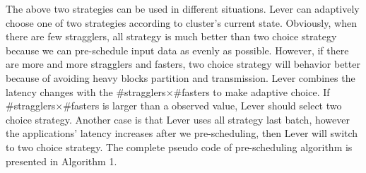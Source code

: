 \documentclass[10pt,conference,compsocconf,letterpaper]{IEEEtran}
\begin{document}
  The above two strategies can be used in different situations. Lever can adaptively choose one of two strategies according to cluster's current state. Obviously, when there are few stragglers, all strategy is much better than two choice strategy because we can pre-schedule input data as evenly as possible. However, if there are more and more stragglers and fasters, two choice strategy will behavior better because of avoiding heavy blocks partition and transmission. Lever combines the latency changes with the \#stragglers$\times$\#fasters to make adaptive choice. If \#stragglers$\times$\#fasters is larger than a observed value, Lever should select two choice strategy. Another case is that Lever uses all strategy last batch, however the applications' latency increases after we pre-scheduling, then Lever will switch to two choice strategy. The complete pseudo code of pre-scheduling algorithm is presented in Algorithm 1.
\end{document}
